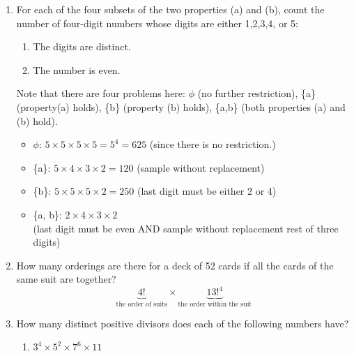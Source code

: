\documentclass[12pt]{article}
\begin{document}


\begin{enumerate}
    \item For each of the four subsets of the two properties (a) and (b), count the number of four-digit numbers whose digits are either 1,2,3,4, or 5:
    \begin{enumerate}[label=(\alph*)]
        \item The digits are distinct.
        \item The number is even.
    \end{enumerate}
    Note that there are four problems here: $\phi$ (no further restriction), \{a\} (property(a) holds), \{b\} (property (b) holds), \{a,b\} (both properties (a) and (b) hold).\\
    
    \begin{itemize}
        \item $\phi$: $5\times 5\times 5\times 5 = 5^4 = 625$ \hfill (since there is no restriction.)
        \item \{a\}: $5\times 4\times 3\times 2 = 120$ \hfill (sample without replacement)
        \item \{b\}: $5\times 5\times 5\times 2 = 250$ \hfill (last digit must be either 2 or 4)
        \item \{a, b\}: $2\times 4\times 3\times 2$ \\ 
        (last digit must be even AND sample without replacement rest of three digits)
    \end{itemize}
    
    
    
    \item How many orderings are there for a deck of 52 cards if all the cards of the same suit are together?
    \boldmath$$\underbrace{4!}_{\text{the order of suits}}\times \underbrace{13!^4}_{\text{the order within the suit}}$$
    
    \item How many distinct positive divisors does each of the following numbers have?
    \begin{enumerate}[label=(\alph*)]
        \item $3^4\times 5^2\times 7^6\times 11$\\
        \\
        

\end{enumerate}
\end{enumerate}
\end{document}
